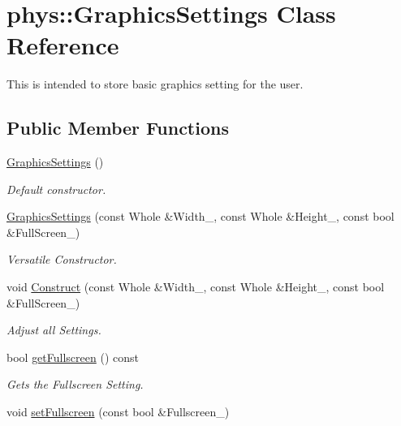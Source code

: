 \hypertarget{classphys_1_1GraphicsSettings}{
\section{phys::GraphicsSettings Class Reference}
\label{dc/df1/classphys_1_1GraphicsSettings}
}


This is intended to store basic graphics setting for the user.  


\subsection*{Public Member Functions}
\begin{DoxyCompactItemize}
\item 
\hyperlink{classphys_1_1GraphicsSettings_aceaaf53585413067adbf271e2c1e48fa}{GraphicsSettings} ()
\begin{DoxyCompactList}\small\item\em Default constructor. \item\end{DoxyCompactList}\item 
\hyperlink{classphys_1_1GraphicsSettings_a7cbb84f41101ef66a04e2a0990f796a2}{GraphicsSettings} (const Whole \&Width\_\-, const Whole \&Height\_\-, const bool \&FullScreen\_\-)
\begin{DoxyCompactList}\small\item\em Versatile Constructor. \item\end{DoxyCompactList}\item 
void \hyperlink{classphys_1_1GraphicsSettings_a63d41a500ee1ddf0ea9ffba5e353bae0}{Construct} (const Whole \&Width\_\-, const Whole \&Height\_\-, const bool \&FullScreen\_\-)
\begin{DoxyCompactList}\small\item\em Adjust all Settings. \item\end{DoxyCompactList}\item 
bool \hyperlink{classphys_1_1GraphicsSettings_a8871ea7d5c65c3b59d1d34b59531743f}{getFullscreen} () const 
\begin{DoxyCompactList}\small\item\em Gets the Fullscreen Setting. \item\end{DoxyCompactList}\item 
void \hyperlink{classphys_1_1GraphicsSettings_aba9e127ab2cf3f20604313e39d32f7a8}{setFullscreen} (const bool \&Fullscreen\_\-)

\end{DoxyCompactItemize}
